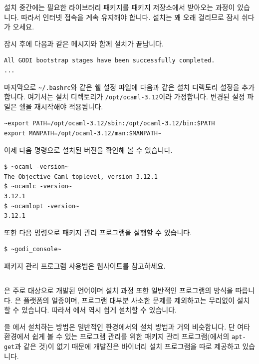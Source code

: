 설치 중간에는 필요한 라이브러리 패키지를 \GODI{} 패키지 저장소에서 받아오는
과정이 있습니다. 따라서 인터넷 접속을 계속 유지해야 합니다. 설치는 꽤 오래
걸리므로 잠시 쉬다가 오세요.

잠시 후에 다음과 같은 메시지와 함께 설치가 끝납니다.
\begin{lstlisting}
All GODI bootstrap stages have been successfully completed.
...
\end{lstlisting}

마지막으로 \texttt{\~{}/.bashrc}와 같은 쉘 설정 파일에 다음과 같은 설치
디렉토리 설정을 추가합니다. 여기서는 설치 디렉토리가 \texttt{/opt/ocaml-3.12}이라
가정합니다. 변경된 설정 파일은 쉘을 재시작해야 적용됩니다.

\begin{lstlisting}
~export PATH=/opt/ocaml-3.12/sbin:/opt/ocaml-3.12/bin:$PATH
export MANPATH=/opt/ocaml-3.12/man:$MANPATH~
\end{lstlisting}

이제 다음 명령으로 설치된 \OCAML{} 버전을 확인해 볼 수 있습니다.

\begin{lstlisting}
$ ~ocaml -version~
The Objective Caml toplevel, version 3.12.1
$ ~ocamlc -version~
3.12.1
$ ~ocamlopt -version~
3.12.1
\end{lstlisting}

또한 다음 명령으로 \GODI{} 패키지 관리 프로그램을 실행할 수 있습니다.

\begin{lstlisting}
$ ~godi_console~
\end{lstlisting}


패키지 관리 프로그램 사용법은 \GODI{} 웹사이트를 참고하세요.


\subsection{\MAC{}}

\OCAML{}은 주로 \UNIX{} 대상으로 개발된 언어이며 설치 과정 또한 일반적인
\UNIX{} 프로그램의 방식을 따릅니다. \MAC{}은 \UNIX{} 플랫폼의 일종이며,
\UNIX{} 프로그램 대부분 사소한 문제를 제외하고는 무리없이 설치할 수 있습니다.
따라서 \MAC{}에서 \OCAML{} 역시 쉽게 설치할 수 있습니다.

\OCAML{}을 \MAC{}에서 설치하는 방법은 일반적인 \UNIX{} 환경에서의 설치 방법과
거의 비슷합니다. 단 여타 \UNIX{} 환경에서 쉽게 볼 수 있는 \UNIX{} 프로그램
관리를 위한 패키지 관리 프로그램(\UBUNTU{}에서의 \texttt{apt-get}과 같은 것)이
없기 때문에 \OCAML{} 개발진은 바이너리 설치 프로그램을 따로 제공하고 있습니다.

